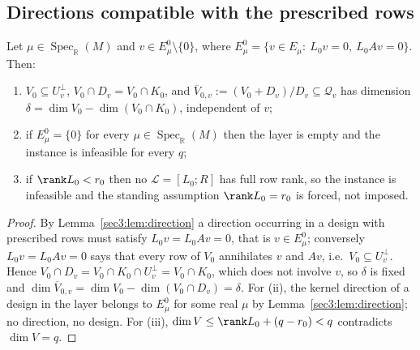 \subsection{Directions compatible with the prescribed rows}
\label{sec3:sub:prescribed}
\begin{lem}
\label{sec3:def:E0}
\label{sec3:lem:prescribed}
\label{sec3:cor:empty}
\label{sec3:proc}
\label{sec3:prop:rankcheck}
Let $\mu\in\operatorname{Spec}_{\mathbb{R}}(M)$ and $v\in E_\mu^0\setminus\{0\}$, where
$E_\mu^0=\{v\in E_\mu:\ L_0v=0,\ L_0Av=0\}$. Then:
\begin{enumerate}[label=(\roman*),leftmargin=*,itemsep=1pt,topsep=2pt]
\item $V_0\subseteq U_v^\perp$, $V_0\cap D_v=V_0\cap K_0$, and
$\overline{V}_{0,v}:=(V_0+D_v)/D_v\subseteq\mathcal{Q}_v$ has dimension
$\delta=\dim V_0-\dim(V_0\cap K_0)$, independent of $v$;
\item if $E_\mu^0=\{0\}$ for every $\mu\in\operatorname{Spec}_{\mathbb{R}}(M)$ then the layer is empty
and the instance is infeasible for every $q$;
\item if $\rank L_0<r_0$ then no $\mathcal{L}=[L_0;R]$ has full row rank, so the instance is
infeasible and the standing assumption $\rank L_0=r_0$ is forced, not imposed.
\end{enumerate}
\end{lem}
\begin{proof}
By Lemma~\ref{sec3:lem:direction} a direction occurring in a design with prescribed rows must satisfy
$L_0v=L_0Av=0$, that is $v\in E_\mu^0$; conversely $L_0v=L_0Av=0$ says that every row of $V_0$
annihilates $v$ and $Av$, i.e.\ $V_0\subseteq U_v^\perp$. Hence
$V_0\cap D_v=V_0\cap K_0\cap U_v^\perp=V_0\cap K_0$, which does not involve $v$, so $\delta$ is fixed
and $\dim\overline{V}_{0,v}=\dim V_0-\dim(V_0\cap D_v)=\delta$. For (ii), the kernel direction of a
design in the layer belongs to $E_\mu^0$ for some real $\mu$ by Lemma~\ref{sec3:lem:direction}; no
direction, no design. For (iii), $\dim V\le\rank L_0+(q-r_0)<q$ contradicts $\dim V=q$.
\end{proof}

